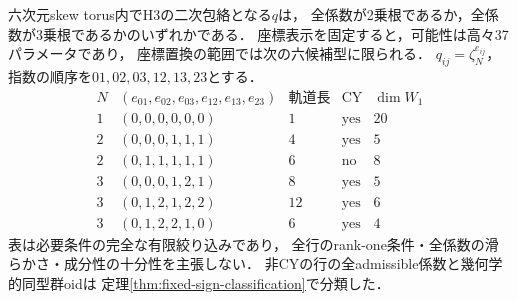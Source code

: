 \begin{theorem}
\label{thm:skew-finite-37}
六次元skew torus内でH3の二次包絡となる$q$は，
全係数が2乗根であるか，全係数が3乗根であるかのいずれかである．
座標表示を固定すると，可能性は高々37パラメータであり，
座標置換の範囲では次の六候補型に限られる．
$q_{ij}=\zeta_N^{e_{ij}}$，指数の順序を$01,02,03,12,13,23$とする．
\[
\begin{array}{c|c|r|c|r}
 N&(e_{01},e_{02},e_{03},e_{12},e_{13},e_{23})
 &\text{軌道長}&\text{CY}&\dim W_1\\\hline
 1&(0,0,0,0,0,0)&1&\text{yes}&20\\
 2&(0,0,0,1,1,1)&4&\text{yes}&5\\
 2&(0,1,1,1,1,1)&6&\text{no}&8\\
 3&(0,0,0,1,2,1)&8&\text{yes}&5\\
 3&(0,1,2,1,2,2)&12&\text{yes}&6\\
 3&(0,1,2,2,1,0)&6&\text{yes}&4
\end{array}
\]
表は必要条件の完全な有限絞り込みであり，
全行のrank-one条件・全係数の滑らかさ・成分性の十分性を主張しない．
非CYの行の全admissible係数と幾何学的同型群oidは
定理\ref{thm:fixed-sign-classification}で分類した．
\end{theorem}
